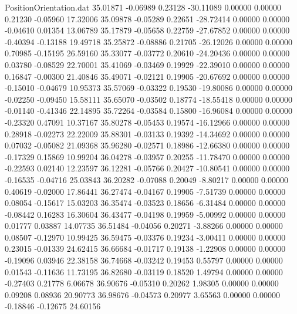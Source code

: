 \begin{filecontents}{PositionOrientation.dat}
  35.01871   -0.06989    0.23128   -30.11089    0.00000    0.00000    0.21230   -0.05960   17.32006
  35.09878   -0.05289    0.22651   -28.72414    0.00000    0.00000   -0.04610    0.01354   13.06789
  35.17879   -0.05658    0.22759   -27.67852    0.00000    0.00000   -0.40394   -0.13188   19.49718
  35.25872   -0.08886    0.21705   -26.12026    0.00000    0.00000    0.70985   -0.15195   26.59160
  35.33077   -0.03772    0.20610   -24.20436    0.00000    0.00000    0.03780   -0.08529   22.70001
  35.41069   -0.03469    0.19929   -22.39010    0.00000    0.00000    0.16847   -0.00300   21.40846
  35.49071   -0.02121    0.19905   -20.67692    0.00000    0.00000   -0.15010   -0.04679   10.95373
  35.57069   -0.03322    0.19530   -19.80086    0.00000    0.00000   -0.02250   -0.09450   15.58111
  35.65070   -0.03502    0.18774   -18.55418    0.00000    0.00000   -0.01140   -0.41346   22.14895
  35.72264   -0.03584    0.15800   -16.96084    0.00000    0.00000   -0.23320    0.47091   10.37167
  35.80278   -0.05453    0.19574   -16.12966    0.00000    0.00000    0.28918   -0.02273   22.22009
  35.88301   -0.03133    0.19392   -14.34692    0.00000    0.00000    0.07032   -0.05082   21.09368
  35.96280   -0.02571    0.18986   -12.66380    0.00000    0.00000   -0.17329    0.15869   10.99204
  36.04278   -0.03957    0.20255   -11.78470    0.00000    0.00000   -0.22593    0.02140   12.23597
  36.12281   -0.05766    0.20427   -10.80541    0.00000    0.00000   -0.16535   -0.04716   25.03843
  36.20282   -0.07088    0.20049    -8.80217    0.00000    0.00000    0.40619   -0.02000   17.86441
  36.27474   -0.04167    0.19905    -7.51739    0.00000    0.00000    0.08054   -0.15617   15.03203
  36.35474   -0.03523    0.18656    -6.31484    0.00000    0.00000   -0.08442    0.16283   16.30604
  36.43477   -0.04198    0.19959    -5.00992    0.00000    0.00000    0.01777    0.03887   14.07735
  36.51484   -0.04056    0.20271    -3.88266    0.00000    0.00000    0.08507   -0.12970   10.99425
  36.59475   -0.03376    0.19234    -3.00411    0.00000    0.00000    0.23015   -0.01339   24.62415
  36.66684   -0.01717    0.19138    -1.22908    0.00000    0.00000   -0.19096    0.03946   22.38158
  36.74668   -0.03242    0.19453     0.55797    0.00000    0.00000    0.01543   -0.11636   11.73195
  36.82680   -0.03119    0.18520     1.49794    0.00000    0.00000   -0.27403    0.21778    6.06678
  36.90676   -0.05310    0.20262     1.98305    0.00000    0.00000    0.09208    0.08936   20.90773
  36.98676   -0.04573    0.20977     3.65563    0.00000    0.00000   -0.18846   -0.12675   24.60156

\end{filecontents}
